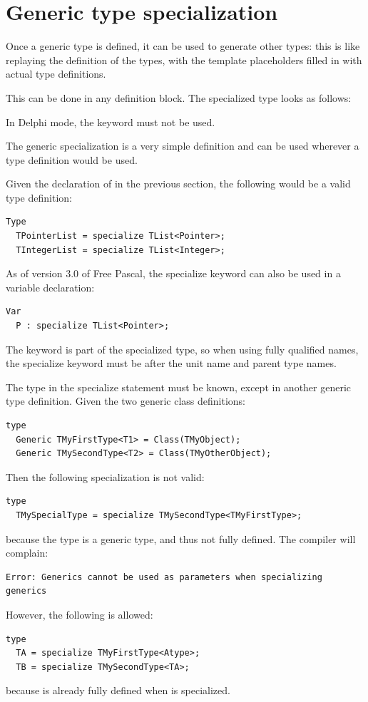 \section{Generic type specialization}
Once a generic type is defined, it can be used to generate other types:
this is like replaying the definition of the types, with the template
placeholders filled in with actual type definitions.

This can be done in any  definition block. The specialized type
looks as follows:

In Delphi mode, the  keyword must not be used.

The generic specialization is a very simple definition and can be used wherever a type definition would be used.

Given the declaration of  in the previous section, the following would be a valid type definition:
\begin{verbatim}
Type
  TPointerList = specialize TList<Pointer>;
  TIntegerList = specialize TList<Integer>;
\end{verbatim}
As of version 3.0 of Free Pascal, the specialize keyword can also be used in a variable declaration:
\begin{verbatim}
Var
  P : specialize TList<Pointer>;
\end{verbatim}
The  keyword is part of the specialized type, so when using
fully qualified names, the specialize keyword must be after the unit name
and parent type names.

The type in the specialize statement must be known, except in another generic type definition.
Given the two generic class definitions:
\begin{verbatim}
type
  Generic TMyFirstType<T1> = Class(TMyObject);
  Generic TMySecondType<T2> = Class(TMyOtherObject);
\end{verbatim}
Then the following specialization is not valid:
\begin{verbatim}
type
  TMySpecialType = specialize TMySecondType<TMyFirstType>;
\end{verbatim}
because the type  is a generic type, and thus not fully defined.  The compiler will complain:
\begin{verbatim}
Error: Generics cannot be used as parameters when specializing generics
\end{verbatim}

However, the following is allowed:
\begin{verbatim}
type
  TA = specialize TMyFirstType<Atype>;
  TB = specialize TMySecondType<TA>;
\end{verbatim}
because  is already fully defined when  is specialized.

